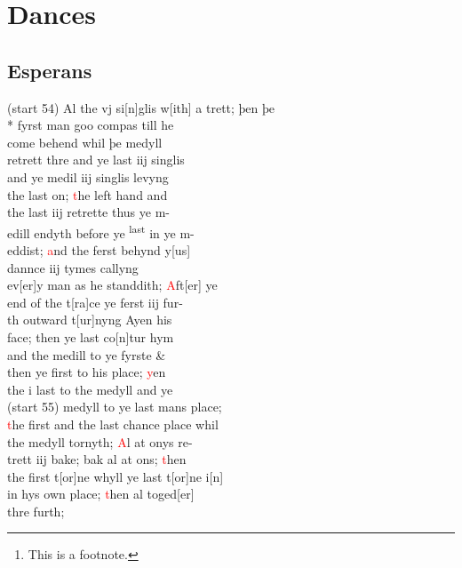 \documentclass[12pt,letter]{article} %
\newcommand{\red}[1]{\textcolor{red}{#1}}
\newcommand{\srcpg}[1]{(start #1)}
\begin{document}
    \title{\rmfamily\normalfont{}}
    \author{}
    \date{} %
    
    \maketitle
    
    \begin{abstract}
        \noindent\lipsum[1] Just a test.\footnote{This is a footnote.}
    \end{abstract}
       
    \tableofcontents
\newpage

    \section{Dances}
    \reversemarginpar
    \subsection{Esperans} \raggedright 
{}\srcpg{54} Al the vj si{[}n{]}glis w{[}ith{]} a trett; þen þe \\* 
fyrst man goo compas till he \\ 
come behend whil þe medyll \\ 
retrett thre and ye last iij singlis \\ 
and ye medil iij singlis levyng\\ 
the last on; \red{t}he left hand and \\
the last iij retrette thus ye m-\\
edill endyth before ye \textsuperscript{last} in ye m-\\
eddist; \red{a}nd the ferst behynd y{[}us{]} \\ 
dannce iij tymes callyng\\ 
ev{[}er{]}y man as he standdith; \red{A}ft{[}er{]} ye\\
end of the t{[}ra{]}ce ye ferst iij fur-\\
th outward t{[}ur{]}nyng Ayen his \\ 
face; then ye  last co{[}n{]}tur hym \\ 
and the medill to ye fyrste \& \\
then ye first to his place; \red{y}en \\ 
the i last to the medyll and ye \\ 
\srcpg{55} medyll to ye last mans  place; \\ 
\red{t}he first and the last chance place whil \\ 
the medyll tornyth; \red{A}l at onys re-\\
trett iij bake; bak al  at ons; \red{t}hen \\ 
the first t{[}or{]}ne whyll ye last t{[}or{]}ne i{[}n{]} \\ 
in hys own place; \red{t}hen al toged{[}er{]}\\ 
thre furth;
\end{document}
